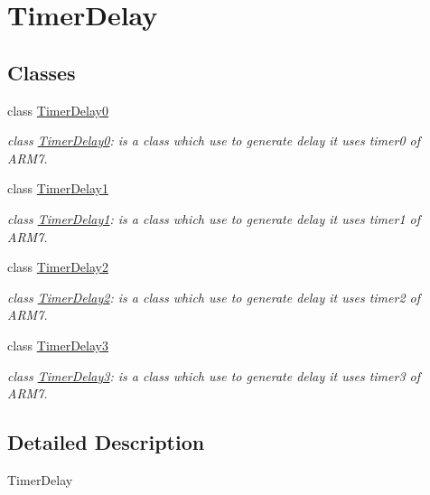 \hypertarget{group__group3}{
\section{TimerDelay}
\label{group__group3}
}
\subsection*{Classes}
\begin{DoxyCompactItemize}
\item 
class \hyperlink{class_timer_delay0}{TimerDelay0}
\begin{DoxyCompactList}\small\item\em class \hyperlink{class_timer_delay0}{TimerDelay0}: is a class which use to generate delay it uses timer0 of ARM7. \end{DoxyCompactList}\item 
class \hyperlink{class_timer_delay1}{TimerDelay1}
\begin{DoxyCompactList}\small\item\em class \hyperlink{class_timer_delay1}{TimerDelay1}: is a class which use to generate delay it uses timer1 of ARM7. \end{DoxyCompactList}\item 
class \hyperlink{class_timer_delay2}{TimerDelay2}
\begin{DoxyCompactList}\small\item\em class \hyperlink{class_timer_delay2}{TimerDelay2}: is a class which use to generate delay it uses timer2 of ARM7. \end{DoxyCompactList}\item 
class \hyperlink{class_timer_delay3}{TimerDelay3}
\begin{DoxyCompactList}\small\item\em class \hyperlink{class_timer_delay3}{TimerDelay3}: is a class which use to generate delay it uses timer3 of ARM7. \end{DoxyCompactList}\end{DoxyCompactItemize}


\subsection{Detailed Description}
TimerDelay 